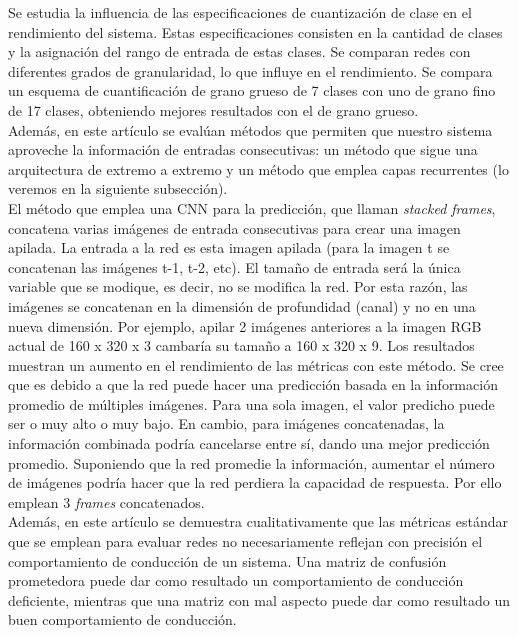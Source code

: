 Se estudia la influencia de las especificaciones de cuantización de clase en el rendimiento del sistema. Estas especificaciones consisten en la cantidad de clases y la asignación del rango de entrada de estas clases. Se comparan redes con diferentes grados de granularidad, lo que influye en el rendimiento. Se compara un esquema de cuantificación de grano grueso de 7 clases con uno de grano fino de 17 clases, obteniendo mejores resultados con el de grano grueso.\\

Además, en este artículo se evalúan métodos que permiten que nuestro sistema aproveche la información de entradas consecutivas: un método que sigue una arquitectura de extremo a extremo y un método que emplea capas recurrentes (lo veremos en la siguiente subsección). \\

El método que emplea una CNN para la predicción, que llaman \textit{stacked frames}, concatena varias imágenes de entrada consecutivas para crear una imagen apilada. La entrada a la red es esta imagen apilada (para la imagen t se concatenan las imágenes t-1, t-2, etc). El tamaño de entrada será la única variable que se modique, es decir, no se modifica la red. Por esta razón, las imágenes se concatenan en la dimensión de profundidad (canal) y no en una nueva dimensión. Por ejemplo, apilar 2 imágenes anteriores a la imagen RGB actual de 160 x 320 x 3 cambaría su tamaño a 160 x 320 x 9. Los resultados muestran un aumento en el rendimiento de las métricas con este método. Se cree que es debido a que la red puede hacer una predicción basada en la información promedio de múltiples imágenes. Para una sola imagen, el valor predicho puede ser o muy alto o muy bajo. En cambio, para imágenes concatenadas, la información combinada podría cancelarse entre sí, dando una mejor predicción promedio. Suponiendo que la red promedie la información, aumentar el número de imágenes podría hacer que la red perdiera la capacidad de respuesta. Por ello emplean 3 \textit{frames} concatenados.\\

Además, en este artículo se demuestra cualitativamente que las métricas estándar que se emplean para evaluar redes no necesariamente reflejan con precisión el comportamiento de conducción de un sistema. Una matriz de confusión prometedora puede dar como resultado un comportamiento de conducción deficiente, mientras que una matriz con mal aspecto puede dar como resultado un buen comportamiento de conducción.



